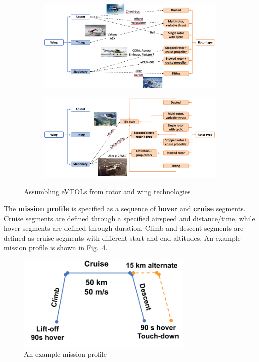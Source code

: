 \begin{figure}
     \centering
     \begin{subfigure}
         \centering
         \includegraphics[width=\textwidth]{images/evtols1.png}
         \label{fig:evtols1}
     \end{subfigure}
     \hfill
     \begin{subfigure}
         \centering
         \includegraphics[width=\textwidth]{images/evtols2.png}
         \label{fig:evtols2}
     \end{subfigure}
        \caption{Assumbling eVTOLs from rotor and wing technologies}
        \label{fig:evtol_types}
\end{figure}

The \textbf{mission profile} is specified as a sequence of \textbf{hover} and \textbf{cruise} segments. Cruise segments are defined through a specified airspeed and distance/time, while hover segments are defined through duration. Climb and descent segments are defined as cruise segments with different start and end altitudes. An example mission profile is shown in Fig.~\ref{fig:mission}. 

\begin{figure}
\begin{center}
\includegraphics[width=0.75\textwidth]{images/mission.png}
\caption{An example mission profile}
\label{fig:mission}
\end{center}
\end{figure}

